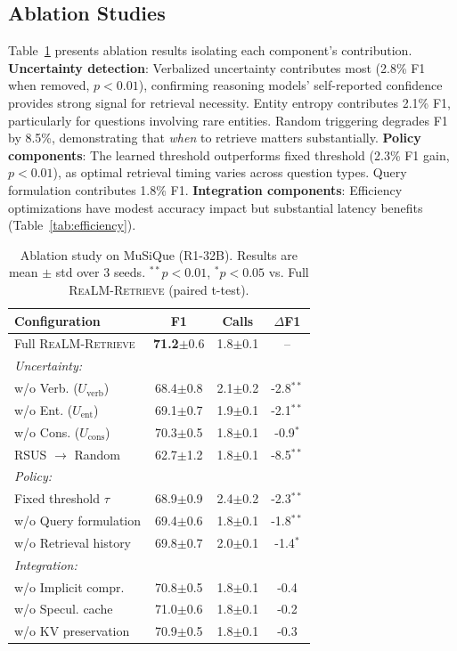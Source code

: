 \documentclass[sigconf,natbib=true]{acmart}
\newcommand{\methodname}{\textsc{ReaLM-Retrieve}}
\begin{document}
\subsection{Ablation Studies}
Table~\ref{tab:ablation} presents ablation results isolating each component's contribution. \textbf{Uncertainty detection}: Verbalized uncertainty contributes most (2.8\% F1 when removed, $p<0.01$), confirming reasoning models' self-reported confidence provides strong signal for retrieval necessity. Entity entropy contributes 2.1\% F1, particularly for questions involving rare entities. Random triggering degrades F1 by 8.5\%, demonstrating that \emph{when} to retrieve matters substantially. \textbf{Policy components}: The learned threshold outperforms fixed threshold (2.3\% F1 gain, $p<0.01$), as optimal retrieval timing varies across question types. Query formulation contributes 1.8\% F1. \textbf{Integration components}: Efficiency optimizations have modest accuracy impact but substantial latency benefits (Table~\ref{tab:efficiency}).

\begin{table}[t]
\small
\centering
\caption{Ablation study on MuSiQue (R1-32B). Results are mean $\pm$ std over 3 seeds. $^{**}p<0.01$, $^{*}p<0.05$ vs. Full \methodname{} (paired t-test).}
\label{tab:ablation}
\begin{tabular}{@{}l|ccc@{}}
\toprule
\textbf{Configuration} & \textbf{F1} & \textbf{Calls} & \textbf{$\Delta$F1} \\
\midrule
Full \methodname{} & \textbf{71.2}$\pm$0.6 & 1.8$\pm$0.1 & -- \\
\midrule
\textit{Uncertainty:} \\
\quad w/o Verb. ($U_{\text{verb}}$) & 68.4$\pm$0.8 & 2.1$\pm$0.2 & -2.8$^{**}$ \\
\quad w/o Ent. ($U_{\text{ent}}$) & 69.1$\pm$0.7 & 1.9$\pm$0.1 & -2.1$^{**}$ \\
\quad w/o Cons. ($U_{\text{cons}}$) & 70.3$\pm$0.5 & 1.8$\pm$0.1 & -0.9$^{*}$ \\
\quad RSUS $\rightarrow$ Random & 62.7$\pm$1.2 & 1.8$\pm$0.1 & -8.5$^{**}$ \\
\midrule
\textit{Policy:} \\
\quad Fixed threshold $\tau$ & 68.9$\pm$0.9 & 2.4$\pm$0.2 & -2.3$^{**}$ \\
\quad w/o Query formulation & 69.4$\pm$0.6 & 1.8$\pm$0.1 & -1.8$^{**}$ \\
\quad w/o Retrieval history & 69.8$\pm$0.7 & 2.0$\pm$0.1 & -1.4$^{*}$ \\
\midrule
\textit{Integration:} \\
\quad w/o Implicit compr. & 70.8$\pm$0.5 & 1.8$\pm$0.1 & -0.4 \\
\quad w/o Specul. cache & 71.0$\pm$0.6 & 1.8$\pm$0.1 & -0.2 \\
\quad w/o KV preservation & 70.9$\pm$0.5 & 1.8$\pm$0.1 & -0.3 \\
\bottomrule
\end{tabular}
\end{table}
\end{document}
